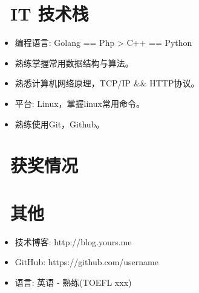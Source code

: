 \documentclass{resume}
\begin{document}

\section{\faCogs\ IT 技术栈}
\begin{itemize}[parsep=0.5ex]
  \item 编程语言: Golang == Php > C++ == Python 
  \item 熟练掌握常用数据结构与算法。
  \item 熟悉计算机网络原理，TCP/IP && HTTP协议。
  \item 平台: Linux，掌握linux常用命令。
  \item 熟练使用Git，Github。
\end{itemize}

\section{\faHeartO\ 获奖情况}

\section{\faInfo\ 其他}
\begin{itemize}[parsep=0.5ex]
  \item 技术博客: http://blog.yours.me
  \item GitHub: https://github.com/username
  \item 语言: 英语 - 熟练(TOEFL xxx)
\end{itemize}

%
%
\end{document}
